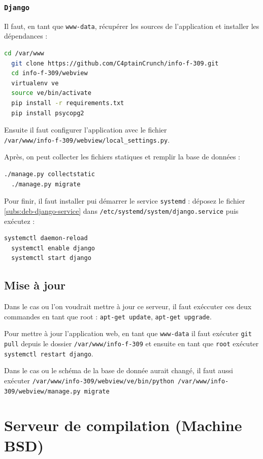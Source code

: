 \documentclass[10pt,a4paper]{article}
\begin{document}
\subsubsection{\texttt{Django}}

Il faut, en tant que \texttt{www-data}, récupérer les sources de l'application et installer les dépendances :
\begin{lstlisting}[language=bash]
  cd /var/www
  git clone https://github.com/C4ptainCrunch/info-f-309.git
  cd info-f-309/webview
  virtualenv ve
  source ve/bin/activate
  pip install -r requirements.txt
  pip install psycopg2
\end{lstlisting}

Ensuite il faut configurer l'application avec le fichier\\\texttt{/var/www/info-f-309/webview/local\_settings.py}.

Après, on peut collecter les fichiers statiques et remplir la base de données :
\begin{lstlisting}[language=bash]
  ./manage.py collectstatic
  ./manage.py migrate
\end{lstlisting}

Pour finir, il faut installer pui démarrer le service \texttt{systemd} :
déposez le fichier \ref{subs:deb-django-service} dans \texttt{/etc/systemd/system/django.service} puis exécutez :
\begin{lstlisting}[language=bash]
  systemctl daemon-reload
  systemctl enable django
  systemctl start django
\end{lstlisting}


\subsection{Mise à jour}

Dans le cas ou l'on voudrait mettre à jour ce serveur,
il faut exéccuter ces deux commandes en tant que root :
\texttt{apt-get update}, \texttt{apt-get upgrade}.

Pour mettre à jour l'application web, en tant que \texttt{www-data}
il faut exécuter \texttt{git pull} depuis le dossier \texttt{/var/www/info-f-309}
et ensuite en tant que \texttt{root} exécuter \texttt{systemctl restart django}.

Dans le cas ou le schéma de la base de donnée aurait changé,
il faut aussi exécuter \texttt{/var/www/info-309/webview/ve/bin/python /var/www/info-309/webview/manage.py migrate}

\section{Serveur de compilation (Machine BSD)}
\end{document}
